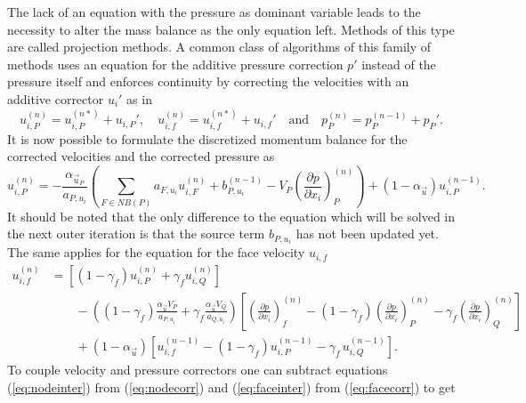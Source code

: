   The lack of an equation with the pressure as dominant variable leads to the necessity to alter the mass balance as the only equation left. Methods of this type are called projection methods. A common class of algorithms of this family of methods uses an equation for the additive pressure correction \(p'\) instead of the pressure itself and enforces continuity by correcting the velocities with an additive corrector \(u_i'\) as in
  \begin{displaymath}
    u_{i,P}^{(n)} =  u_{i,P}^{(n*)}  + u_{i,P}',\quad u_{i,f}^{(n)} =  u_{i,f}^{(n*)}  + u_{i,f}' \quad \text{and} \quad   p_P^{(n)} =  p_P^{(n-1)}  + p_P'.
  \end{displaymath}
  It is now possible to formulate the discretized momentum balance for the corrected velocities and the corrected pressure as
  \begin{equation}
    \label{eq:nodecorr}
    u_{i,P}^{(n)} 
    = 
    - \frac{\alpha_{\vec{u}_P}}{a_{P,u_i}} \left(\sum_{F \in NB(P)} a_{F,u_i} u_{i,F}^{(n)}
    +                                     b_{P,u_i}^{(n-1)} 
    -                                     V_P\left(\frac{\partial p}{\partial x_i}\right)_P^{(n)} \right)
    + \left(1 - \alpha_{\vec{u}}\right) u_{i,P}^{(n-1)}  .
  \end{equation}
  It should be noted that the only difference to the equation which will be solved in the next outer iteration is that the source term \(b_{P,u_i}\) has not been updated yet. The same applies for the equation for the face velocity \(u_{i,f}\)
  \begin{align}
    \label{eq:facecorr}
    u_{i,f}^{(n)} 
    &=
    \left[\left(1 - \gamma_f\right) u_{i,P}^{(n)} + \gamma_f u_{i,Q}^{(n)} \right] \nonumber\\[1em]
    &\quad\quad - 
    \left(\left(1 - \gamma_f\right) \frac{\alpha_\vec{u} V_P}{a_{P,u_i}} + \gamma_f \frac{\alpha_\vec{u} V_Q}{a_{Q,u_i}}\right)
    \left[ 
    \left(\frac{\partial p}{\partial x_i}\right)_f^{(n)} 
    -  \left(1 - \gamma_f\right) \left( \frac{\partial p}{\partial x_i} \right)_P^{(n)} 
    - \gamma_f \left(\frac{\partial p}{\partial x_i}\right)_Q^{(n)} 
    \right] \nonumber \\[1em]
    &\quad\quad + \left(1 - \alpha_\vec{u}\right) \left[ u_{i,f}^{(n-1)} - \left(1 - \gamma_f\right) u_{i,P}^{(n-1)} - \gamma_f \, u_{i,Q}^{(n-1)} \right].
  \end{align}
  To couple velocity and pressure correctors one can subtract equations (\ref{eq:nodeinter}) from (\ref{eq:nodecorr}) and (\ref{eq:faceinter}) from (\ref{eq:facecorr}) to get
